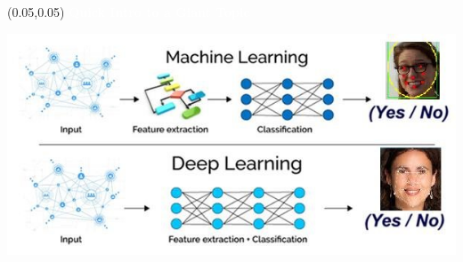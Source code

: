 \documentclass[aspectratio=169]{beamer} %
\begin{document}
\begin{frame}{}
    \setlength{\TPHorizModule}{\textwidth}
    \setlength{\TPVertModule}{\textwidth}
    \begin{textblock}{0.74} (0.05,0.05)
        \bfseries\large\textcolor{white}{Quick Intro to a Giant Topic}
    \end{textblock}
    \bigskip
    \includegraphics[width=1.0\linewidth,height=0.7\textheight]{../images/Diff-ML-DL.jpg}

\end{frame}
\end{document}
